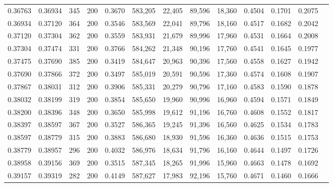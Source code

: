 \begin{tabular}{rrrrrrrrrrrrr}
0.36763 & 0.36934 &   345 & 200 &                                     0.3670 & 583,205 &  22,405 &  89,596 &  18,360 & 0.4504 & 0.1701 & 0.2075 \\
0.36934 & 0.37120 &   364 & 200 &                                     0.3546 & 583,569 &  22,041 &  89,796 &  18,160 & 0.4517 & 0.1682 & 0.2042 \\
0.37120 & 0.37304 &   362 & 200 &                                     0.3559 & 583,931 &  21,679 &  89,996 &  17,960 & 0.4531 & 0.1664 & 0.2008 \\
0.37304 & 0.37474 &   331 & 200 &                                     0.3766 & 584,262 &  21,348 &  90,196 &  17,760 & 0.4541 & 0.1645 & 0.1977 \\
0.37475 & 0.37690 &   385 & 200 &                                     0.3419 & 584,647 &  20,963 &  90,396 &  17,560 & 0.4558 & 0.1627 & 0.1942 \\
0.37690 & 0.37866 &   372 & 200 &                                     0.3497 & 585,019 &  20,591 &  90,596 &  17,360 & 0.4574 & 0.1608 & 0.1907 \\
0.37867 & 0.38031 &   312 & 200 &                                     0.3906 & 585,331 &  20,279 &  90,796 &  17,160 & 0.4583 & 0.1590 & 0.1878 \\
0.38032 & 0.38199 &   319 & 200 &                                     0.3854 & 585,650 &  19,960 &  90,996 &  16,960 & 0.4594 & 0.1571 & 0.1849 \\
0.38200 & 0.38396 &   348 & 200 &                                     0.3650 & 585,998 &  19,612 &  91,196 &  16,760 & 0.4608 & 0.1552 & 0.1817 \\
0.38397 & 0.38597 &   367 & 200 &                                     0.3527 & 586,365 &  19,245 &  91,396 &  16,560 & 0.4625 & 0.1534 & 0.1783 \\
0.38597 & 0.38779 &   315 & 200 &                                     0.3883 & 586,680 &  18,930 &  91,596 &  16,360 & 0.4636 & 0.1515 & 0.1753 \\
0.38779 & 0.38957 &   296 & 200 &                                     0.4032 & 586,976 &  18,634 &  91,796 &  16,160 & 0.4644 & 0.1497 & 0.1726 \\
0.38958 & 0.39156 &   369 & 200 &                                     0.3515 & 587,345 &  18,265 &  91,996 &  15,960 & 0.4663 & 0.1478 & 0.1692 \\
0.39157 & 0.39319 &   282 & 200 &                                     0.4149 & 587,627 &  17,983 &  92,196 &  15,760 & 0.4671 & 0.1460 & 0.1666 \\

\end{tabular}
